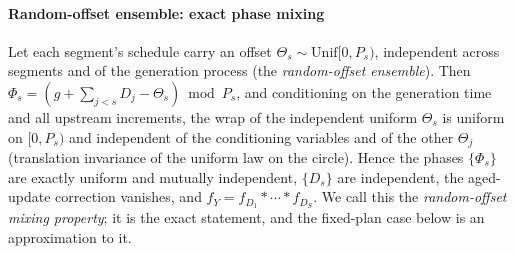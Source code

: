 \documentclass[twocolumn,3p,times,procedia]{elsarticle}
\theoremstyle{plain}
\theoremstyle{remark}
\begin{document}
\paragraph*{Random-offset ensemble: exact phase mixing}
Let each segment's schedule carry an offset
$\Theta_s\sim\mathrm{Unif}[0,P_s)$, independent across segments and of
the generation process (the \emph{random-offset ensemble}). Then
$\Phi_s=(g+\sum_{j<s}D_j-\Theta_s)\bmod P_s$, and conditioning on the
generation time and all upstream increments, the wrap of the independent
uniform $\Theta_s$ is uniform on $[0,P_s)$ and independent of the
conditioning variables and of the other $\Theta_j$ (translation
invariance of the uniform law on the circle). Hence the phases
$\{\Phi_s\}$ are exactly uniform and mutually independent, $\{D_s\}$ are
independent, the aged-update correction vanishes, and
$f_Y=f_{D_1}\ast\cdots\ast f_{D_S}$. We call this the
\emph{random-offset mixing property}; it is the exact statement, and the
fixed-plan case below is an approximation to it.
\end{document}
